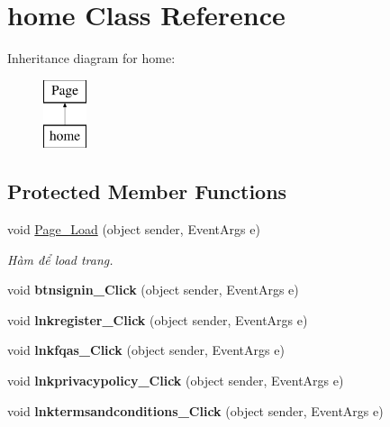 \hypertarget{classhome}{\section{home Class Reference}
\label{classhome}
}
Inheritance diagram for home\-:\begin{figure}[H]
\begin{center}
\leavevmode
\includegraphics[height=2.000000cm]{classhome}
\end{center}
\end{figure}
\subsection*{Protected Member Functions}
\begin{DoxyCompactItemize}
\item 
void \hyperlink{classhome_a0966224aba2b7c5d1157a8383339db89}{Page\-\_\-\-Load} (object sender, Event\-Args e)
\begin{DoxyCompactList}\small\item\em Hàm để load trang. \end{DoxyCompactList}\item 
\hypertarget{classhome_aa077ce267f49a5b1fc42752b4007ea74}{void {\bfseries btnsignin\-\_\-\-Click} (object sender, Event\-Args e)}\label{classhome_aa077ce267f49a5b1fc42752b4007ea74}

\item 
\hypertarget{classhome_a929ab2b52ad63ed175a13bc34a874e87}{void {\bfseries lnkregister\-\_\-\-Click} (object sender, Event\-Args e)}\label{classhome_a929ab2b52ad63ed175a13bc34a874e87}

\item 
\hypertarget{classhome_a85a380d2567afa84fdb37a68056a0a61}{void {\bfseries lnkfqas\-\_\-\-Click} (object sender, Event\-Args e)}\label{classhome_a85a380d2567afa84fdb37a68056a0a61}

\item 
\hypertarget{classhome_a9956abd3ce21521d84ea29e4e49a43eb}{void {\bfseries lnkprivacypolicy\-\_\-\-Click} (object sender, Event\-Args e)}\label{classhome_a9956abd3ce21521d84ea29e4e49a43eb}

\item 
\hypertarget{classhome_ae67d0bc0a7ff45061f576208955efc00}{void {\bfseries lnktermsandconditions\-\_\-\-Click} (object sender, Event\-Args e)}\label{classhome_ae67d0bc0a7ff45061f576208955efc00}

\end{DoxyCompactItemize}


